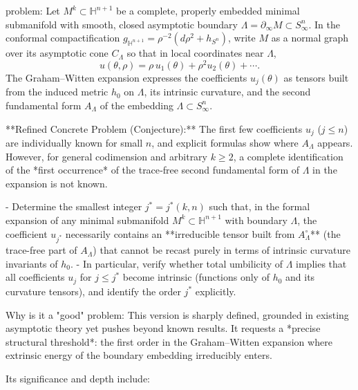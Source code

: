 problem:  
Let \(M^k \subset \mathbb{H}^{n+1}\) be a complete, properly embedded minimal submanifold with smooth, closed asymptotic boundary \(\Lambda = \partial_\infty M \subset S^n_\infty\).  
In the conformal compactification \(g_{\mathbb{H}^{n+1}} = \rho^{-2}(d\rho^2 + h_{S^n})\), write \(M\) as a normal graph over its asymptotic cone \(C_\Lambda\) so that in local coordinates near \(\Lambda\),
\[
u(\theta,\rho) = \rho\, u_1(\theta) + \rho^2 u_2(\theta) + \cdots .
\]
The Graham–Witten expansion expresses the coefficients \(u_j(\theta)\) as tensors built from the induced metric \(h_0\) on \(\Lambda\), its intrinsic curvature, and the second fundamental form \(A_\Lambda\) of the embedding \(\Lambda\subset S^n_\infty\).

**Refined Concrete Problem (Conjecture):**  
The first few coefficients \(u_j\) (\(j\!\le\!n\)) are individually known for small \(n\), and explicit formulas show where \(A_\Lambda\) appears. However, for general codimension and arbitrary \(k \geq 2\), a complete identification of the *first occurrence* of the trace‑free second fundamental form of \(\Lambda\) in the expansion is not known.

- Determine the smallest integer \(j^* = j^*(k,n)\) such that, in the formal expansion of any minimal submanifold \(M^k \subset \mathbb{H}^{n+1}\) with boundary \(\Lambda\), the coefficient \(u_{j^*}\) necessarily contains an **irreducible tensor built from \(A^\circ_\Lambda\)** (the trace-free part of \(A_\Lambda\)) that cannot be recast purely in terms of intrinsic curvature invariants of \(h_0\).  
- In particular, verify whether total umbilicity of \(\Lambda\) implies that all coefficients \(u_j\) for \(j \le j^*\) become intrinsic (functions only of \(h_0\) and its curvature tensors), and identify the order \(j^*\) explicitly.

Why is it a "good" problem:  
This version is sharply defined, grounded in existing asymptotic theory yet pushes beyond known results. It requests a *precise structural threshold*: the first order in the Graham–Witten expansion where extrinsic energy of the boundary embedding irreducibly enters.  

Its significance and depth include:  

